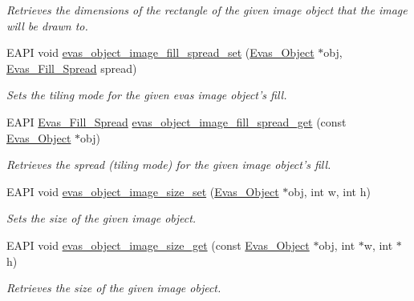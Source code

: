 \begin{DoxyCompactItemize}
\begin{DoxyCompactList}\small\item\em Retrieves the dimensions of the rectangle of the given image object that the image will be drawn to. \item\end{DoxyCompactList}\item 
EAPI void \hyperlink{group__Evas__Object__Image_ga0015a660507a5562e118a1777947f881}{evas\_\-object\_\-image\_\-fill\_\-spread\_\-set} (\hyperlink{group__Evas__Object__Group_ga9e19e6dd1f517a0ba437c0114d3e7c97}{Evas\_\-Object} $\ast$obj, \hyperlink{Evas_8h_a693bc9123af8452d9771c2a849b8805c}{Evas\_\-Fill\_\-Spread} spread)
\begin{DoxyCompactList}\small\item\em Sets the tiling mode for the given evas image object's fill. \item\end{DoxyCompactList}\item 
EAPI \hyperlink{Evas_8h_a693bc9123af8452d9771c2a849b8805c}{Evas\_\-Fill\_\-Spread} \hyperlink{group__Evas__Object__Image_gae86928005f983627c74dbaef6c0fbb0e}{evas\_\-object\_\-image\_\-fill\_\-spread\_\-get} (const \hyperlink{group__Evas__Object__Group_ga9e19e6dd1f517a0ba437c0114d3e7c97}{Evas\_\-Object} $\ast$obj)
\begin{DoxyCompactList}\small\item\em Retrieves the spread (tiling mode) for the given image object's fill. \item\end{DoxyCompactList}\item 
EAPI void \hyperlink{group__Evas__Object__Image_gaf85031267b5fab16874ebbf944dded22}{evas\_\-object\_\-image\_\-size\_\-set} (\hyperlink{group__Evas__Object__Group_ga9e19e6dd1f517a0ba437c0114d3e7c97}{Evas\_\-Object} $\ast$obj, int w, int h)
\begin{DoxyCompactList}\small\item\em Sets the size of the given image object. \item\end{DoxyCompactList}\item 
EAPI void \hyperlink{group__Evas__Object__Image_ga43e6f1b16ebe859826e6901cb36995ad}{evas\_\-object\_\-image\_\-size\_\-get} (const \hyperlink{group__Evas__Object__Group_ga9e19e6dd1f517a0ba437c0114d3e7c97}{Evas\_\-Object} $\ast$obj, int $\ast$w, int $\ast$h)
\begin{DoxyCompactList}\small\item\em Retrieves the size of the given image object. \item\end{DoxyCompactList}\item 

\end{DoxyCompactItemize}
